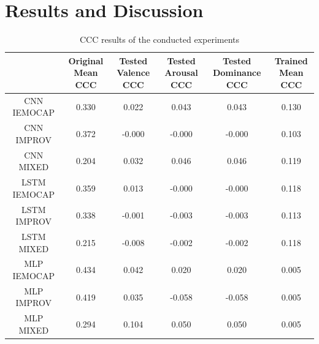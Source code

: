 \documentclass[a4paper,11pt]{article}
\begin{document}
\section{Results and Discussion} \label{sec:results}
\begin{table}[h]
    \centering
    \begin{tabular}{cccccc}
        \toprule
        {} &  \makecell{Original\\ Mean CCC} &  \makecell{Tested\\ Valence CCC} &  \makecell{Tested\\ Arousal CCC} &  \makecell{Tested\\ Dominance CCC} &  \makecell{Trained \\Mean CCC} \\
        \midrule
        CNN IEMOCAP  &              0.330 &               0.022 &               0.043 &                 0.043 &             0.130 \\ \midrule
        CNN IMPROV   &              0.372 &              -0.000 &              -0.000 &                -0.000 &             0.103 \\\midrule
        CNN MIXED    &              0.204 &               0.032 &               0.046 &                 0.046 &             0.119 \\\midrule
        LSTM IEMOCAP &              0.359 &               0.013 &              -0.000 &                -0.000 &             0.118 \\\midrule
        LSTM IMPROV  &              0.338 &              -0.001 &              -0.003 &                -0.003 &             0.113 \\\midrule
        LSTM MIXED   &              0.215 &              -0.008 &              -0.002 &                -0.002 &             0.118 \\\midrule
        MLP IEMOCAP  &              0.434 &               0.042 &               0.020 &                 0.020 &             0.005 \\\midrule
        MLP IMPROV   &              0.419 &               0.035 &              -0.058 &                -0.058 &             0.005 \\\midrule
        MLP MIXED    &              0.294 &               0.104 &               0.050 &                 0.050 &             0.005 \\
        \bottomrule
        \end{tabular}
        
    \caption{CCC results of the conducted experiments}
    \label{tab:CCCloss}
\end{table}
\end{document}
